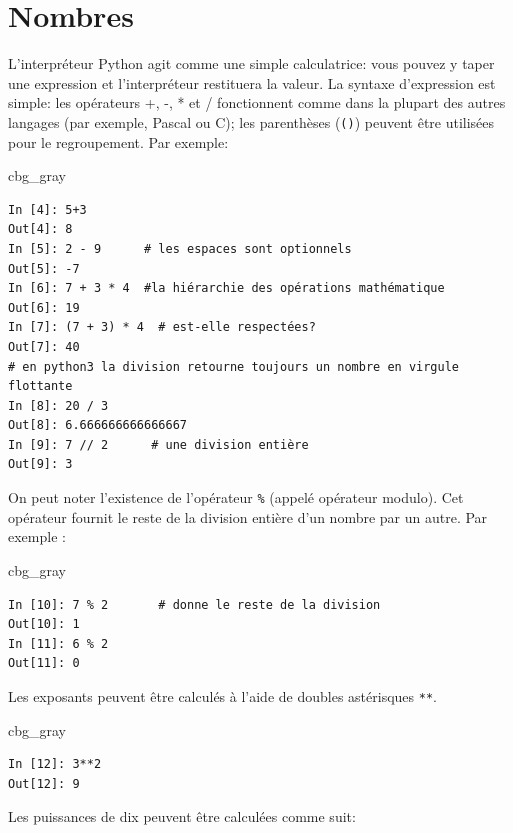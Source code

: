 \documentclass[%
oneside,                 %
final,                   %
10pt]{article}
\newenvironment{_cod_tight}[1]{
   \def\FrameCommand{\colorbox{#1}}
   \FrameRule0.6pt\MakeFramed {\FrameRestore}\vskip3mm}
   {\vskip0mm\endMakeFramed}
\newenvironment{cod}[1]{
\bgroup\rmfamily
\fboxsep=0mm\relax
\begin{_cod_tight}{#1}
\list{}{\parsep=-2mm\parskip=0mm\topsep=0pt\leftmargin=2mm
\rightmargin=2\leftmargin\leftmargin=4pt\relax}
\item\relax}
{\endlist\end{_cod_tight}\egroup}
\begin{document}
\section{Nombres}

L'interpréteur Python agit comme une simple calculatrice: vous pouvez y taper une expression et l'interpréteur restituera la valeur. La syntaxe d'expression est simple: les opérateurs +, -, * et / fonctionnent comme dans la plupart des autres langages (par exemple, Pascal ou C); les parenthèses (\texttt{()}) peuvent être utilisées pour le regroupement. Par exemple:

\begin{cod}{cbg_gray}\begin{verbatim}
In [4]: 5+3
Out[4]: 8
In [5]: 2 - 9      # les espaces sont optionnels
Out[5]: -7
In [6]: 7 + 3 * 4  #la hiérarchie des opérations mathématique
Out[6]: 19
In [7]: (7 + 3) * 4  # est-elle respectées?
Out[7]: 40
# en python3 la division retourne toujours un nombre en virgule flottante
In [8]: 20 / 3
Out[8]: 6.666666666666667
In [9]: 7 // 2      # une division entière
Out[9]: 3
\end{verbatim}
\end{cod}
\noindent
On peut noter l’existence de l’opérateur \Verb!%! (appelé opérateur modulo). Cet opérateur fournit le reste de la division entière d’un nombre par un autre. Par exemple :

\begin{cod}{cbg_gray}\begin{verbatim}
In [10]: 7 % 2       # donne le reste de la division
Out[10]: 1
In [11]: 6 % 2
Out[11]: 0
\end{verbatim}
\end{cod}
\noindent

Les exposants peuvent être calculés à l'aide de doubles astérisques \texttt{**}.

\begin{cod}{cbg_gray}\begin{verbatim}
In [12]: 3**2
Out[12]: 9
\end{verbatim}
\end{cod}
\noindent

Les puissances de dix peuvent être calculées comme suit:
\end{document}
